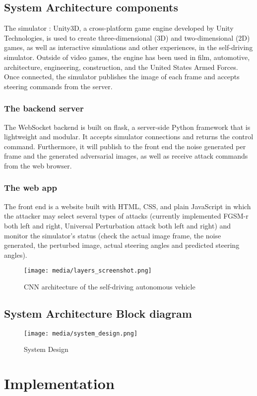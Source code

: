 \documentclass[ 12pt,a4paper,twocolumn,fleqn]{article}
\begin{document}
\subsection{System Architecture components}
The simulator : Unity3D, a cross-platform game engine developed by Unity Technologies, is used to create three-dimensional (3D) and two-dimensional (2D) games, as well as interactive simulations and other experiences, in the self-driving simulator. Outside of video games, the engine has been used in film, automotive, architecture, engineering, construction, and the United States Armed Forces. Once connected, the simulator publishes the image of each frame and accepts steering commands from the server.
\subsubsection{The backend server}
The WebSocket backend is built on flask, a server-side Python framework that is lightweight and modular. It accepts simulator connections and returns the control command. Furthermore, it will publish to the front end the noise generated per frame and the generated adversarial images, as well as receive attack commands from the web browser.
\subsubsection{The web app}
The front end is a website built with HTML, CSS, and plain JavaScript in which the attacker may select several types of attacks (currently implemented FGSM-r both left and right, Universal Perturbation attack both left and right) and monitor the simulator's status (check the actual image frame, the noise generated, the perturbed image, actual steering angles and predicted steering angles).
\begin{figure}[H]
\texttt{[image: media/layers\_screenshot.png]}
\centering
\caption{CNN architecture of the self-driving autonomous vehicle}
\end{figure}
\subsection{System Architecture Block diagram}
\begin{figure}[H]
\texttt{[image: media/system\_design.png]}
\centering
\caption{System Design}
\end{figure}



\section{Implementation}
\end{document}
